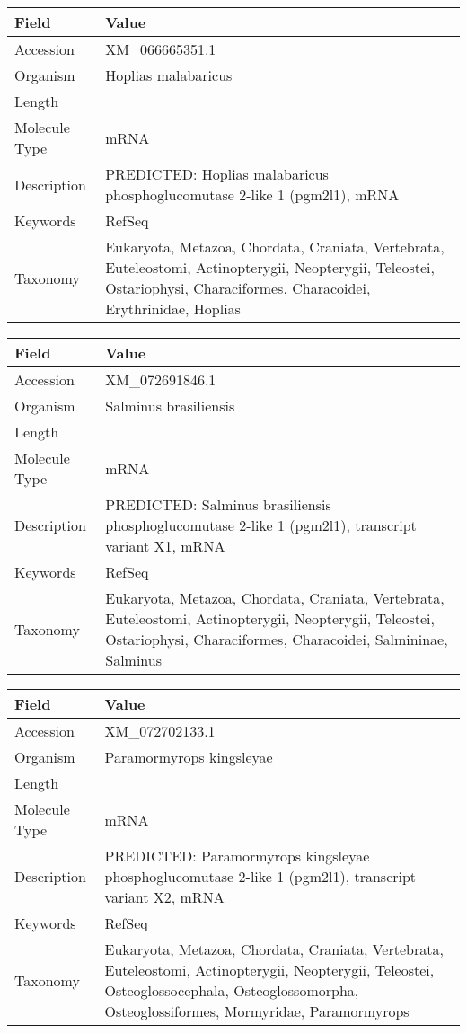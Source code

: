 \documentclass[10pt]{article}
\begin{document}
{\footnotesize
\begin{longtable}{>{\raggedright\arraybackslash}p{4.5cm} >{\raggedright\arraybackslash}p{11.5cm}}
\textbf{Field} & \textbf{Value} \\
\hline
Accession & XM\_066665351.1 \\
Organism & Hoplias malabaricus \\
Length & 4621 \\
Molecule Type & mRNA \\
Description & PREDICTED: Hoplias malabaricus phosphoglucomutase 2-like 1 (pgm2l1), mRNA \\
Keywords & RefSeq \\
Taxonomy & Eukaryota, Metazoa, Chordata, Craniata, Vertebrata, Euteleostomi, Actinopterygii, Neopterygii, Teleostei, Ostariophysi, Characiformes, Characoidei, Erythrinidae, Hoplias \\
\end{longtable}
}

{\footnotesize
\begin{longtable}{>{\raggedright\arraybackslash}p{4.5cm} >{\raggedright\arraybackslash}p{11.5cm}}
\textbf{Field} & \textbf{Value} \\
\hline
Accession & XM\_072691846.1 \\
Organism & Salminus brasiliensis \\
Length & 4322 \\
Molecule Type & mRNA \\
Description & PREDICTED: Salminus brasiliensis phosphoglucomutase 2-like 1 (pgm2l1), transcript variant X1, mRNA \\
Keywords & RefSeq \\
Taxonomy & Eukaryota, Metazoa, Chordata, Craniata, Vertebrata, Euteleostomi, Actinopterygii, Neopterygii, Teleostei, Ostariophysi, Characiformes, Characoidei, Salmininae, Salminus \\
\end{longtable}
}

{\footnotesize
\begin{longtable}{>{\raggedright\arraybackslash}p{4.5cm} >{\raggedright\arraybackslash}p{11.5cm}}
\textbf{Field} & \textbf{Value} \\
\hline
Accession & XM\_072702133.1 \\
Organism & Paramormyrops kingsleyae \\
Length & 5964 \\
Molecule Type & mRNA \\
Description & PREDICTED: Paramormyrops kingsleyae phosphoglucomutase 2-like 1 (pgm2l1), transcript variant X2, mRNA \\
Keywords & RefSeq \\
Taxonomy & Eukaryota, Metazoa, Chordata, Craniata, Vertebrata, Euteleostomi, Actinopterygii, Neopterygii, Teleostei, Osteoglossocephala, Osteoglossomorpha, Osteoglossiformes, Mormyridae, Paramormyrops \\
\end{longtable}
}
\end{document}
